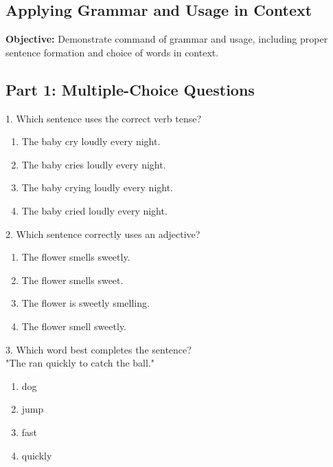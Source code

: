 \documentclass[12pt]{article}
\begin{document}
\subsection*{Applying Grammar and Usage in Context}
\onehalfspacing

\begin{tcolorbox}[colframe=black!40, colback=gray!0, title=Learning Objective]
\textbf{Objective:} Demonstrate command of grammar and usage, including proper sentence formation and choice of words in context.
\end{tcolorbox}

\subsection*{Part 1: Multiple-Choice Questions}

1. Which sentence uses the correct verb tense?\\
\begin{enumerate}[label=\Alph*.]
    \item The baby cry loudly every night.  
    \item The baby cries loudly every night.  
    \item The baby crying loudly every night.  
    \item The baby cried loudly every night.  
\end{enumerate}

\vspace{1cm}

2. Which sentence correctly uses an adjective?\\
\begin{enumerate}[label=\Alph*.]
    \item The flower smells sweetly.  
    \item The flower smells sweet.  
    \item The flower is sweetly smelling.  
    \item The flower smell sweetly.  
\end{enumerate}

\vspace{1cm}

3. Which word best completes the sentence?\\
"The \underline{\hspace{4cm}} ran quickly to catch the ball."\\
\begin{enumerate}[label=\Alph*.]
    \item dog  
    \item jump  
    \item fast  
    \item quickly  
\end{enumerate}
\end{document}
